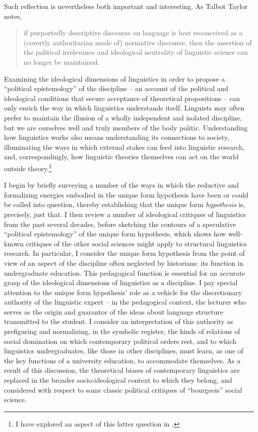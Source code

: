 \documentclass[output=paper]{langscibook}
\begin{document}
Such reflection is nevertheless both important and interesting. As Talbot Taylor notes, 

\begin{quotation}
if purportedly descriptive discourse on language is best reconceived as a (covertly authoritarian mode of) normative discourse, then the assertion of the political irrelevance and ideological neutrality of linguistic science can no longer be maintained. \citep[25]{Taylor1990}
\end{quotation}

Examining the ideological dimensions of linguistics in order to propose a ``political epistemology'' of the discipline – an account of the political and ideological conditions that secure acceptance of theoretical propositions – can only enrich the way in which linguistics understands itself. Linguists may often prefer to maintain the illusion of a wholly independent and isolated discipline, but we are ourselves well and truly members of the body politic. Understanding how linguistics works also means understanding its connections to society, illuminating the ways in which external stakes can feed into linguistic research, and, correspondingly, how linguistic theories themselves can act on the world outside theory.\footnote{I have explored an aspect of this latter question in \citet{Riemer2019}.}

I begin by briefly surveying a number of the ways in which the reductive and formalizing energies embodied in the unique form hypothesis have been or could be called into question, thereby establishing that the unique form \emph{hypothesis} is, precisely, just that. I then review a number of ideological critiques of linguistics from the past several decades, before sketching the contours of a speculative ``political epistemology'' of the unique form hypothesis, which shows how well-known critiques of the other social sciences might apply to structural linguistics research. In particular, I consider the unique form hypothesis from the point of view of an aspect of the discipline often neglected by historians: its function in undergraduate education. This pedagogical function is essential for an accurate grasp of the ideological dimensions of linguistics as a discipline. I pay special attention to the unique form hypothesis' role as a vehicle for the discretionary authority of the linguistic expert – in the pedagogical context, the lecturer who serves as the origin and guarantor of the ideas about language structure transmitted to the student. I consider an interpretation of this authority as prefiguring and normalizing, in the symbolic register, the kinds of relations of social domination on which contemporary political orders rest, and to which linguistics undergraduates, like those in other disciplines, must learn, as one of the key functions of a university education, to accommodate themselves. As a result of this discussion, the theoretical biases of contemporary linguistics are replaced in the broader socio-ideological context to which they belong, and considered with respect to some classic political critiques of ``bourgeois'' social science.
\end{document}
